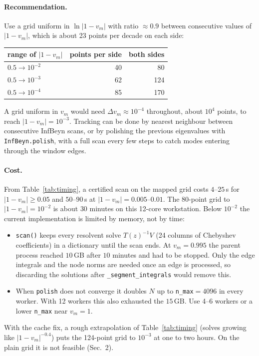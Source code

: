 \documentclass[11pt]{article}
\newcommand{\infbeyn}{InfBeyn}
\begin{document}
\paragraph{Recommendation.} Use a grid uniform in $\ln|1-v_m|$ with ratio $\approx0.9$ between consecutive
values of $|1-v_m|$, which is about 23 points per decade on each side:
\begin{center}
\begin{tabular}{lrr}
\toprule
range of $|1-v_m|$ & points per side & both sides\\
\midrule
$0.5\to10^{-2}$ & 40 & 80\\
$0.5\to10^{-3}$ & 62 & 124\\
$0.5\to10^{-4}$ & 85 & 170\\
\bottomrule
\end{tabular}
\end{center}
A grid uniform in $v_m$ would need $\Delta v_m\approx10^{-4}$ throughout, about $10^4$ points, to reach
$|1-v_m|=10^{-3}$. Tracking can be done by nearest neighbour between consecutive \infbeyn{} scans, or by
polishing the previous eigenvalues with \texttt{InfBeyn.polish}, with a full scan every few steps to catch modes
entering through the window edges.

\paragraph{Cost.} From Table~\ref{tab:timing}, a certified scan on the mapped grid costs $4$--$25$\,s for
$|1-v_m|\ge0.05$ and $50$--$90$\,s at $|1-v_m|=0.005$--$0.01$. The 80-point grid to $|1-v_m|=10^{-2}$ is about
$30$ minutes on this 12-core workstation. Below $10^{-2}$ the current implementation is limited by memory,
not by time:
\begin{itemize}
  \item \texttt{scan()} keeps every resolvent solve $T(z)^{-1}V$ (24 columns of Chebyshev coefficients) in a
  dictionary until the scan ends. At $v_m=0.995$ the parent process reached $10$\,GB after $10$ minutes and
  had to be stopped. Only the edge integrals and the node norms are needed once an edge is processed, so
  discarding the solutions after \texttt{\_segment\_integrals} would remove this.
  \item When \texttt{polish} does not converge it doubles $N$ up to \texttt{n\_max}$=4096$ in every worker. With
  12 workers this also exhausted the $15$\,GB. Use 4--6 workers or a lower \texttt{n\_max} near $v_m=1$.
\end{itemize}
With the cache fix, a rough extrapolation of Table~\ref{tab:timing} (solves growing like $|1-v_m|^{-0.4}$) puts
the 124-point grid to $10^{-3}$ at one to two hours. On the plain grid it is not feasible (Sec.~2).
\end{document}
